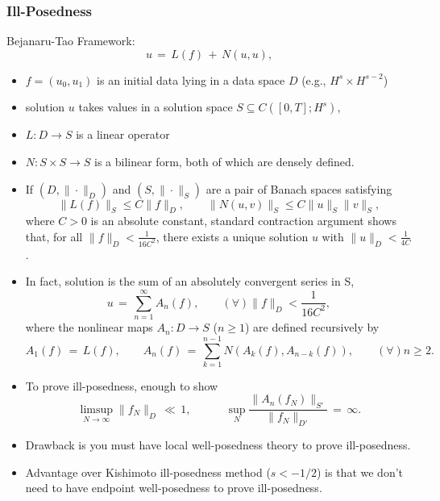 \documentclass{beamer}
\numberwithin{equation*}{section}
\begin{document}
\begin{frame}
\frametitle{Ill-Posedness}
Bejanaru-Tao Framework:
\begin{equation*}
u\,=\,L(f)\,+\,N(u,u),
\end{equation*}
\begin{itemize}
\item
$f=(u_0, u_1)$ is an initial data lying in a data space $D$ (e.g., $H^s \times H^{s-2}$)
\pause
\item solution $u$ takes values in a solution space $S \subseteq	 C([0, T]; H^s)$,
\pause
\item $L: D \to S$ is a linear operator
\pause
\item $N:S\times S \to S$ is a bilinear form, both of which are densely defined. \pause
\item 
If  $(D,\|\cdot \|_D)$ and $(S,\|\cdot \|_S)$ are a pair of Banach spaces satisfying 
\begin{equation*}
\|L(f)\|_S \leq C \|f\|_D,\qquad \|N(u,v)\|_S \leq C \|u\|_S \|v\|_S,
\label{estim}
\end{equation*}
where $C>0$ is an absolute constant, standard contraction argument shows that, for all  $\|f\|_D<\frac{1}{16C^2}$, there exists a unique solution $u$ with $\|u\|_D<\frac{1}{4C}$. 
\end{itemize}
\end{frame}
\begin{frame}
\begin{itemize}
\item In fact, solution is the sum of an absolutely convergent series in S, 
\begin{equation*}
u\,=\,\sum_{n=1}^{\infty} A_n(f), \qquad (\forall) \|f\|_D<\frac{1}{16C^2},
\label{series}
\end{equation*}
where the nonlinear maps $A_n: D\to S$ ($n\geq 1$) are defined recursively by
\begin{equation*}
A_1(f)\,=\,L(f), \qquad A_n(f)\,=\,\sum_{k=1}^{n-1} N(A_k(f),A_{n-k}(f)), \qquad (\forall)n\geq 2.
\label{An}
\end{equation*}
\pause
\item{}
To prove ill-posedness, enough to show
\begin{equation*}
\limsup_{N\to \infty} \|f_N\|_D\,\ll\,1, \qquad \quad \sup_N \frac{\|A_n(f_N)\|_{S'}}{\|f_N\|_{D'}}\,=\,\infty.
\end{equation*}
\pause
\item{}
Drawback is you must have local well-posedness theory to prove ill-posedness. 
\pause
\item{}
Advantage over Kishimoto ill-posedness method ($s < -1/2$) is that we don't need to have endpoint well-posedness to prove ill-posedness.
\end{itemize}  
\end{frame}
\end{document}
